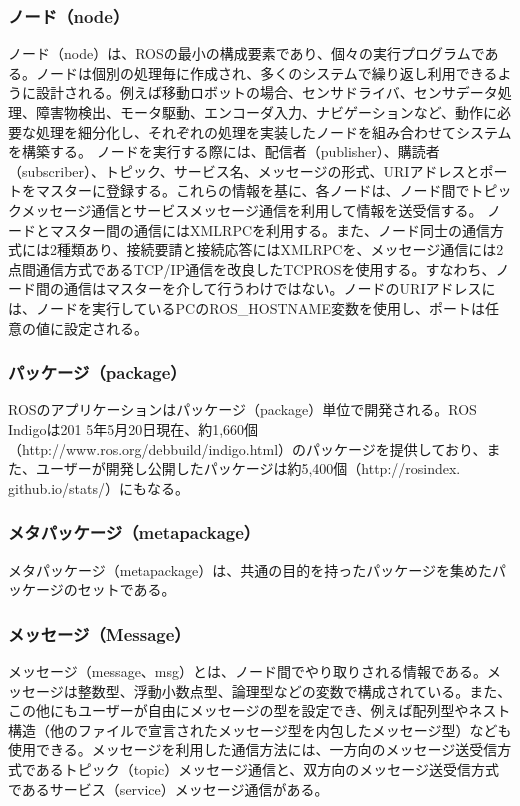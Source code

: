 \subsubsection{ノード（node）}
ノード（node）は、ROSの最小の構成要素であり、個々の実行プログラムである。ノードは個別の処理毎に作成され、多くのシステムで繰り返し利用できるように設計される。例えば移動ロボットの場合、センサドライバ、センサデータ処理、障害物検出、モータ駆動、エンコーダ入力、ナビゲーションなど、動作に必要な処理を細分化し、それぞれの処理を実装したノードを組み合わせてシステムを構築する。
ノードを実行する際には、配信者（publisher）、購読者（subscriber）、トピック、サービス名、メッセージの形式、URIアドレスとポートをマスターに登録する。これらの情報を基に、各ノードは、ノード間でトピックメッセージ通信とサービスメッセージ通信を利用して情報を送受信する。
ノードとマスター間の通信にはXMLRPCを利用する。また、ノード同士の通信方式には2種類あり、接続要請と接続応答にはXMLRPCを、メッセージ通信には2点間通信方式であるTCP/IP通信を改良したTCPROSを使用する。すなわち、ノード間の通信はマスターを介して行うわけではない。ノードのURIアドレスには、ノードを実行しているPCのROS\_HOSTNAME変数を使用し、ポートは任意の値に設定される。

\subsubsection{パッケージ（package）}
ROSのアプリケーションはパッケージ（package）単位で開発される。ROS Indigoは201 5年5月20日現在、約1,660個（http://www.ros.org/debbuild/indigo.html）のパッケージを提供しており、また、ユーザーが開発し公開したパッケージは約5,400個（http://rosindex.\\github.io/stats/）にもなる。

\subsubsection{メタパッケージ（metapackage）}
メタパッケージ（metapackage）は、共通の目的を持ったパッケージを集めたパッケージのセットである。

\subsubsection{メッセージ（Message）}
メッセージ（message、msg）とは、ノード間でやり取りされる情報である。メッセージは整数型、浮動小数点型、論理型などの変数で構成されている。また、この他にもユーザーが自由にメッセージの型を設定でき、例えば配列型やネスト構造（他のファイルで宣言されたメッセージ型を内包したメッセージ型）なども使用できる。メッセージを利用した通信方法には、一方向のメッセージ送受信方式であるトピック（topic）メッセージ通信と、双方向のメッセージ送受信方式であるサービス（service）メッセージ通信がある。

